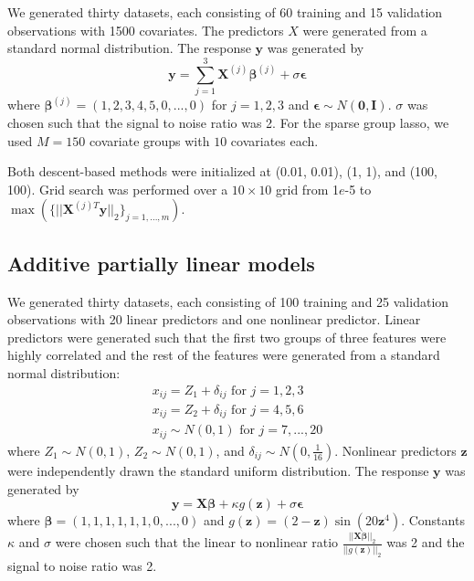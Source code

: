 \documentclass[12pt,letterpaper]{article}
\begin{document}
We generated thirty datasets, each consisting of 60 training and 15 validation observations with 1500 covariates. The predictors $X$ were generated from a standard normal distribution. The response $\boldsymbol y$ was generated by
\begin{equation}
\boldsymbol y = \sum\limits_{j=1}^3 \boldsymbol X^{(j)} \boldsymbol \beta^{(j)} + \sigma \boldsymbol \epsilon
\end{equation}
where $\boldsymbol \beta^{(j)} = (1, 2, 3, 4, 5, 0, ..., 0)$ for $j = 1, 2, 3$ and $\boldsymbol \epsilon \sim N(\boldsymbol 0, \boldsymbol I)$. $\sigma$ was chosen such that the signal to noise ratio was 2. For the sparse group lasso, we used $M=150$ covariate groups with $10$ covariates each.

Both descent-based methods were initialized at (0.01, 0.01), (1, 1), and (100, 100). Grid search was performed over a $10 \times 10$ grid from 1$e$-5 to $\max(\{||\boldsymbol X^{(j)T} \boldsymbol y ||_2\}_{j=1,..., m})$.

\subsection{Additive partially linear models}\label{sec:simulationAPLM}

We generated thirty datasets, each consisting of 100 training and 25 validation observations with 20 linear predictors and one nonlinear predictor. Linear predictors were generated such that the first two groups of three features were highly correlated and the rest of the features were generated from a standard normal distribution:
\begin{equation}
\begin{array}{c}
x_{ij} = Z_1 + \delta_{ij} \text{ for } j=1, 2, 3 \\
x_{ij} = Z_2 + \delta_{ij} \text{ for } j= 4, 5, 6 \\
x_{ij} \sim N(0,1) \text{ for } j = 7, ..., 20
\end{array}
\end{equation}
where $Z_1 \sim N(0,1)$, $Z_2 \sim N(0,1)$, and $\delta_{ij} \sim N(0, \frac{1}{16})$. Nonlinear predictors $\boldsymbol z$ were independently drawn the standard uniform distribution. The response $\boldsymbol y$ was generated by
\begin{equation}
\boldsymbol y = \boldsymbol X \boldsymbol \beta + \kappa g(\boldsymbol z) + \sigma \boldsymbol \epsilon
\end{equation}
where $\boldsymbol \beta = (1, 1, 1, 1, 1, 1, 0, ..., 0)$ and $g(\boldsymbol z) =(2-\boldsymbol z)\sin(20 \boldsymbol z^4)$. Constants $\kappa$ and $\sigma$ were chosen such that the linear to nonlinear ratio $\frac{||\boldsymbol X \boldsymbol \beta||_2}{||g(\boldsymbol z)||_2}$ was 2 and the signal to noise ratio was 2. 
\end{document}
